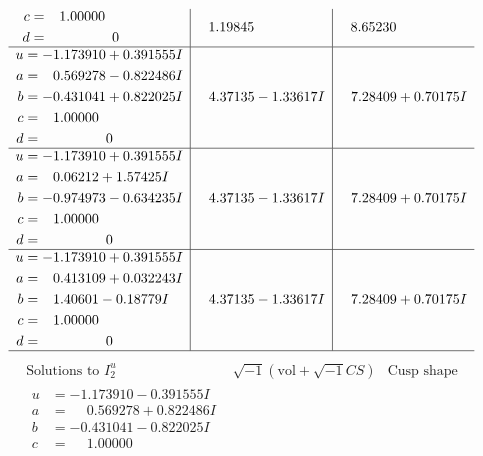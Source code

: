 \documentclass[1p]{elsarticle_modified}
\theoremstyle{definition}
\newcommand{\I}{\sqrt{-1}}
\begin{document}
$$\begin{array}{c|c|c}
\begin{aligned}
c &= \phantom{-}1.00000\phantom{ +0.000000I} \\
d &= \phantom{-0.000000 } 0\end{aligned}
 & \phantom{-}1.19845\phantom{ +0.000000I} & \phantom{-}8.65230\phantom{ +0.000000I} \\ \hline\begin{aligned}
u &= -1.173910 + 0.391555 I \\
a &= \phantom{-}0.569278 - 0.822486 I \\
b &= -0.431041 + 0.822025 I \\
c &= \phantom{-}1.00000\phantom{ +0.000000I} \\
d &= \phantom{-0.000000 } 0\end{aligned}
 & \phantom{-}4.37135 - 1.33617 I & \phantom{-}7.28409 + 0.70175 I \\ \hline\begin{aligned}
u &= -1.173910 + 0.391555 I \\
a &= \phantom{-}0.06212 + 1.57425 I \\
b &= -0.974973 - 0.634235 I \\
c &= \phantom{-}1.00000\phantom{ +0.000000I} \\
d &= \phantom{-0.000000 } 0\end{aligned}
 & \phantom{-}4.37135 - 1.33617 I & \phantom{-}7.28409 + 0.70175 I \\ \hline\begin{aligned}
u &= -1.173910 + 0.391555 I \\
a &= \phantom{-}0.413109 + 0.032243 I \\
b &= \phantom{-}1.40601 - 0.18779 I \\
c &= \phantom{-}1.00000\phantom{ +0.000000I} \\
d &= \phantom{-0.000000 } 0\end{aligned}
 & \phantom{-}4.37135 - 1.33617 I & \phantom{-}7.28409 + 0.70175 I\\
 \hline 
 \end{array}$$\newpage$$\begin{array}{c|c|c}  
\text{Solutions to }I^u_{2}& \I (\text{vol} + \sqrt{-1}CS) & \text{Cusp shape}\\
 \hline 
\begin{aligned}
u &= -1.173910 - 0.391555 I \\
a &= \phantom{-}0.569278 + 0.822486 I \\
b &= -0.431041 - 0.822025 I \\
c &= \phantom{-}1.00000\phantom{ +0.000000I} \\

\end{aligned}
\end{array}$$
\end{document}
